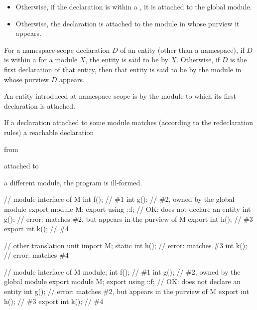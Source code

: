 \begin{std.txt}
\begin{after}
\begin{itemize}
  \item Otherwise, if the declaration is
  within a , it
  is attached to the global module.

  \item Otherwise, the declaration is
  attached to the module in whose purview it appears.
  \end{itemize}
  \end{after}

  \alinea
  \begin{before}\color{addclr}
For a namespace-scope declaration $D$ of an entity (other than a
namespace), if $D$ is within a 
for a module $X$, the entity is said to be  by $X$.
Otherwise, if $D$ is the first declaration of that entity, then that entity is said
to be  by the module in whose purview $D$ appears. 
\end{before}
\begin{after}\color{addclr}
An entity introduced at namespace scope is  by the
module to which its first declaration is attached.
\end{after}

  \alinea
  If a declaration attached to some module
  matches (according to the redeclaration rules) a reachable declaration
  \begin{before}\color{addclr}
  from
  \end{before}
  \begin{after}\color{addclr}
  attached to
  \end{after}
  a different module, 
  the program is ill-formed.
  \begin{example}
    \begin{before}\color{addclr}
    \begin{codeblock}
      // module interface of M
      int f();            // \#1
      int g();            // \#2, owned by the global module
      export module M;
      export using ::f;   // OK: does not declare an entity
      int g();            // error: matches \#2, but appears in the purview of M
      export int h();     // \#3
      export int k();     // \#4

      // other translation unit
      import M;
      static int h();     // error: matches \#3
      int k();            // error: matches \#4
    \end{codeblock}
    \end{before}\begin{after}\color{addclr}
    \begin{codeblock}
      // module interface of M
      module;
      int f();            // \#1
      int g();            // \#2, owned by the global module
      export module M;
      export using ::f;   // OK: does not declare an entity
      int g();            // error: matches \#2, but appears in the purview of M
      export int h();     // \#3
      export int k();     // \#4


\end{codeblock}
\end{after}
\end{example}
\end{std.txt}
